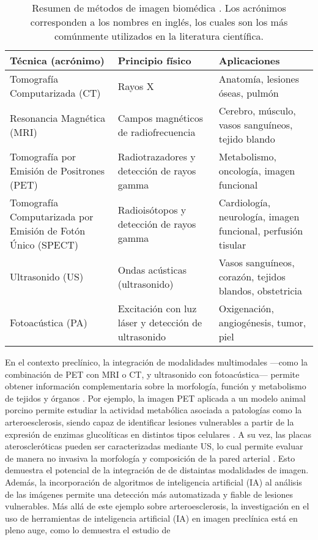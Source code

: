 \documentclass[10pt,a4paper]{article}
\begin{document}
\begin{table}[H]
	\small
	\centering
	\caption{Resumen de métodos de imagen biomédica \cite{Bushberg2021}. Los acrónimos corresponden a los nombres en inglés, los cuales son los más comúnmente utilizados en la literatura científica.} 
	\begin{tabularx}{\textwidth}{X|X|X}
		\\
		\hline
		\textbf{Técnica (acrónimo)} & \textbf{Principio físico} & \textbf{Aplicaciones} \\
		\hline\hline
		Tomografía Computarizada (CT) & Rayos X & Anatomía, lesiones óseas, pulmón \\
		\hline
		Resonancia Magnética (MRI) & Campos magnéticos de radiofrecuencia & Cerebro, músculo, vasos sanguíneos, tejido blando \\
		\hline
		Tomografía por Emisión de Positrones (PET) & Radiotrazadores y detección de rayos gamma & Metabolismo, oncología, imagen funcional \\
		\hline
		Tomografía Computarizada por Emisión de Fotón Único (SPECT) & Radioisótopos y detección de rayos gamma & Cardiología, neurología, imagen funcional, perfusión tisular \\
		\hline
		Ultrasonido (US) & Ondas acústicas (ultrasonido) & Vasos sanguíneos, corazón, tejidos blandos, obstetricia \\
		\hline
		Fotoacústica (PA) & Excitación con luz láser y detección de ultrasonido & Oxigenación, angiogénesis, tumor, piel \\
		\hline
	\end{tabularx}
	\label{tab:metodos-imagen}
\end{table}

En el contexto preclínico, la integración de modalidades multimodales —como la combinación de PET con MRI o CT, y ultrasonido con fotoacústica— permite obtener información complementaria sobre la morfología, función y metabolismo de tejidos y órganos \cite{Wu2018, Perez-Liva_2025}. Por ejemplo, la imagen PET aplicada a un modelo animal porcino permite estudiar la actividad metabólica asociada a patologías como la arteroesclerosis, siendo capaz de identificar lesiones vulnerables a partir de la expresión de enzimas glucolíticas en distintos tipos celulares \cite{Nogales2025}. A su vez, las placas ateroscleróticas pueden ser caracterizadas mediante US, lo cual permite evaluar de manera no invasiva la morfología y composición de la pared arterial \cite{Yao2023}. Esto demuestra el potencial de la integración de de distaintas modalidades de imagen. Además, la incorporación de algoritmos de inteligencia artificial (IA) al análisis de las imágenes permite una detección más automatizada y fiable de lesiones vulnerables\cite{Wang2025}. Más allá de este ejemplo sobre arteroesclerosis, la investigación en el uso de herramientas de inteligencia artificial (IA) en imagen preclínica está en pleno auge, como lo demuestra el estudio de \cite{DeRosa2023}
\end{document}
